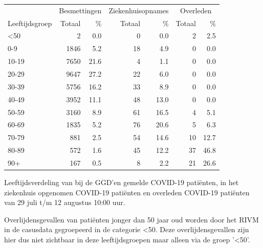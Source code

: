 \documentclass[
  english,
  man,floatsintext]{apa6}
\begin{document}
\begin{table}
\centering\begingroup\fontsize{11}{13}\selectfont

\begin{threeparttable}
\begin{tabular}{lrrrrrr}
\toprule
\multicolumn{1}{c}{ } & \multicolumn{2}{c}{Besmettingen} & \multicolumn{2}{c}{Ziekenhuisopnames} & \multicolumn{2}{c}{Overleden} \\
\cmidrule(l{3pt}r{3pt}){2-3} \cmidrule(l{3pt}r{3pt}){4-5} \cmidrule(l{3pt}r{3pt}){6-7}
Leeftijdsgroep & Totaal & \% & Totaal & \% & Totaal & \%\\
\midrule
<50 & 2 & 0.0 & 0 & 0.0 & 2 & 2.5\\
0-9 & 1846 & 5.2 & 18 & 4.9 & 0 & 0.0\\
10-19 & 7650 & 21.6 & 4 & 1.1 & 0 & 0.0\\
20-29 & 9647 & 27.2 & 22 & 6.0 & 0 & 0.0\\
30-39 & 5756 & 16.2 & 33 & 8.9 & 0 & 0.0\\
40-49 & 3952 & 11.1 & 48 & 13.0 & 0 & 0.0\\
50-59 & 3160 & 8.9 & 61 & 16.5 & 4 & 5.1\\
60-69 & 1835 & 5.2 & 76 & 20.6 & 5 & 6.3\\
70-79 & 881 & 2.5 & 54 & 14.6 & 10 & 12.7\\
80-89 & 572 & 1.6 & 45 & 12.2 & 37 & 46.8\\
90+ & 167 & 0.5 & 8 & 2.2 & 21 & 26.6\\
\bottomrule
\end{tabular}
\begin{tablenotes}
\item[1] Leeftijdsverdeling van bij de GGD’en gemelde COVID-19 patiënten, in het ziekenhuis opgenomen COVID-19 patiënten en overleden COVID-19 patiënten van 29 juli t/m 12 augustus 10:00 uur.
\item[2] Overlijdensgevallen van patiënten jonger dan 50 jaar oud worden door het RIVM in de casusdata gegroepeerd in de categorie <50. Deze overlijdensgevallen zijn hier dus niet zichtbaar in deze leeftijdsgroepen maar alleen via de groep '<50'.
\end{tablenotes}
\end{threeparttable}
\endgroup{}
\end{table}

\newpage
\end{document}

